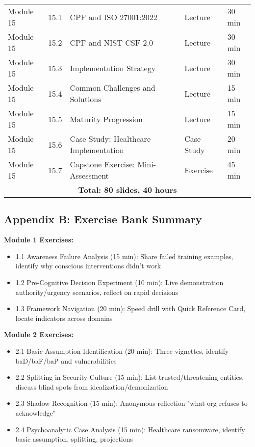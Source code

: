 \documentclass[11pt,a4paper]{article}
\begin{document}
\begin{longtable}{|p{2cm}|p{1cm}|p{7cm}|p{2cm}|p{1.5cm}|}
Module 15 & 15.1 & CPF and ISO 27001:2022 & Lecture & 30 min \\
Module 15 & 15.2 & CPF and NIST CSF 2.0 & Lecture & 30 min \\
Module 15 & 15.3 & Implementation Strategy & Lecture & 30 min \\
Module 15 & 15.4 & Common Challenges and Solutions & Lecture & 15 min \\
Module 15 & 15.5 & Maturity Progression & Lecture & 15 min \\
Module 15 & 15.6 & Case Study: Healthcare Implementation & Case Study & 20 min \\
Module 15 & 15.7 & Capstone Exercise: Mini-Assessment & Exercise & 45 min \\
\hline

\multicolumn{5}{|c|}{\textbf{Total: 80 slides, 40 hours}} \\
\hline

\end{longtable}

\subsection{Appendix B: Exercise Bank Summary}

\textbf{Module 1 Exercises:}
\begin{itemize}
\item 1.1 Awareness Failure Analysis (15 min): Share failed training examples, identify why conscious interventions didn't work
\item 1.2 Pre-Cognitive Decision Experiment (10 min): Live demonstration authority/urgency scenarios, reflect on rapid decisions
\item 1.3 Framework Navigation (20 min): Speed drill with Quick Reference Card, locate indicators across domains
\end{itemize}

\textbf{Module 2 Exercises:}
\begin{itemize}
\item 2.1 Basic Assumption Identification (20 min): Three vignettes, identify baD/baF/baP and vulnerabilities
\item 2.2 Splitting in Security Culture (15 min): List trusted/threatening entities, discuss blind spots from idealization/demonization
\item 2.3 Shadow Recognition (15 min): Anonymous reflection "what org refuses to acknowledge"
\item 2.4 Psychoanalytic Case Analysis (15 min): Healthcare ransomware, identify basic assumption, splitting, projections
\end{itemize}
\end{document}
